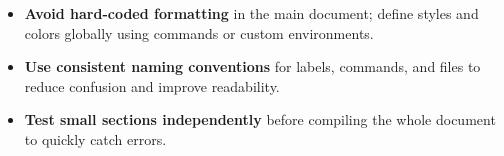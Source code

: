 \documentclass[../../main.tex]{subfiles}
\begin{document}
\begin{itemize}
    \item \textbf{Avoid hard-coded formatting} in the main document; define styles and colors globally using commands or custom environments.
    
    \item \textbf{Use consistent naming conventions} for labels, commands, and files to reduce confusion and improve readability.
    
    \item \textbf{Test small sections independently} before compiling the whole document to quickly catch errors.
\end{itemize}

\clearpage
\end{document}
